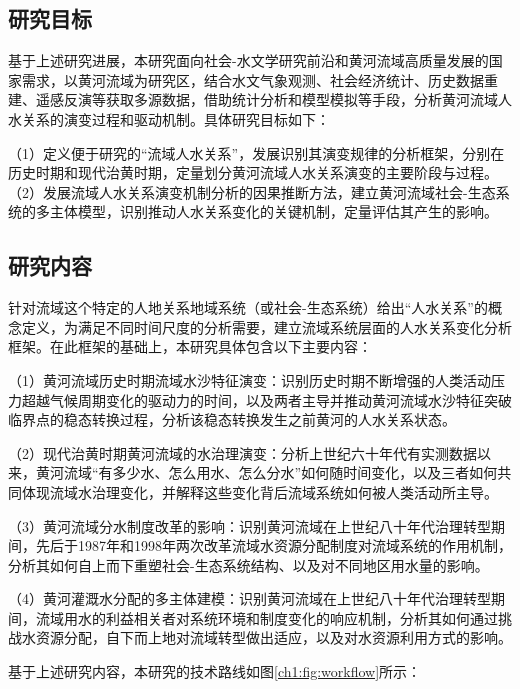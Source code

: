 
\subsection{研究目标}
基于上述研究进展，本研究面向社会-水文学研究前沿和黄河流域高质量发展的国家需求，以黄河流域为研究区，结合水文气象观测、社会经济统计、历史数据重建、遥感反演等获取多源数据，借助统计分析和模型模拟等手段，分析黄河流域人水关系的演变过程和驱动机制。具体研究目标如下：

（1）定义便于研究的“流域人水关系”，发展识别其演变规律的分析框架，分别在历史时期和现代治黄时期，定量划分黄河流域人水关系演变的主要阶段与过程。
（2）发展流域人水关系演变机制分析的因果推断方法，建立黄河流域社会-生态系统的多主体模型，识别推动人水关系变化的关键机制，定量评估其产生的影响。


\subsection{研究内容}

针对流域这个特定的人地关系地域系统（或社会-生态系统）给出“人水关系”的概念定义，为满足不同时间尺度的分析需要，建立流域系统层面的人水关系变化分析框架。在此框架的基础上，本研究具体包含以下主要内容：

（1）黄河流域历史时期流域水沙特征演变：识别历史时期不断增强的人类活动压力超越气候周期变化的驱动力的时间，以及两者主导并推动黄河流域水沙特征突破临界点的稳态转换过程，分析该稳态转换发生之前黄河的人水关系状态。

（2）现代治黄时期黄河流域的水治理演变：分析上世纪六十年代有实测数据以来，黄河流域“有多少水、怎么用水、怎么分水”如何随时间变化，以及三者如何共同体现流域水治理变化，并解释这些变化背后流域系统如何被人类活动所主导。

（3）黄河流域分水制度改革的影响：识别黄河流域在上世纪八十年代治理转型期间，先后于1987年和1998年两次改革流域水资源分配制度对流域系统的作用机制，分析其如何自上而下重塑社会-生态系统结构、以及对不同地区用水量的影响。

（4）黄河灌溉水分配的多主体建模：识别黄河流域在上世纪八十年代治理转型期间，流域用水的利益相关者对系统环境和制度变化的响应机制，分析其如何通过挑战水资源分配，自下而上地对流域转型做出适应，以及对水资源利用方式的影响。

基于上述研究内容，本研究的技术路线如图\ref{ch1:fig:workflow}所示：

